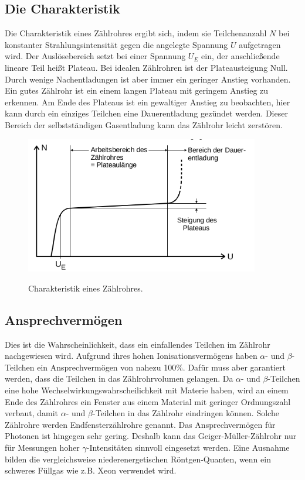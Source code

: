 \subsection{Die Charakteristik}
Die Charakteristik eines Zählrohres ergibt sich, indem sie Teilchenanzahl $N$ bei konstanter
Strahlungsintensität gegen die angelegte Spannung $U$ aufgetragen wird.
Der Auslösebereich setzt bei einer Spannung $U_E$ ein, der anschließende lineare Teil
heißt Plateau. Bei idealen Zählrohren ist der Plateausteigung Null.
Durch wenige Nachentladungen ist aber immer ein geringer Anstieg vorhanden.
Ein gutes Zählrohr ist ein einem langen Plateau mit geringem Anstieg zu erkennen.
Am Ende des Plateaus ist ein gewaltiger Anstieg zu beobachten, hier kann durch ein einziges
Teilchen eine Dauerentladung gezündet werden. Dieser Bereich der selbstständigen Gasentladung
kann das Zählrohr leicht zerstören.

\begin{figure}
  \centering
  \includegraphics[height=6cm]{plateau.png}
  \caption{Charakteristik eines Zählrohres.}
  \cite{skript}
\end{figure}

\subsection{Ansprechvermögen}
Dies ist die Wahrscheinlichkeit, dass ein einfallendes Teilchen im Zählrohr
nachgewiesen wird. Aufgrund ihres hohen Ionisationsvermögens haben
$\alpha$- und $\beta$-Teilchen ein Ansprechvermögen von nahezu 100\%.
Dafür muss aber garantiert werden, dass die Teilchen in das Zählrohrvolumen gelangen.
Da $\alpha$- und $\beta$-Teilchen eine hohe Wechselwirkungswahrscheilichkeit mit Materie
haben, wird an einem Ende des Zählrohres ein Fenster aus einem Material mit
geringer Ordnungszahl verbaut, damit $\alpha$- und $\beta$-Teilchen in das Zählrohr eindringen
können. Solche Zählrohre werden Endfensterzählrohre genannt.
Das Ansprechvermögen für Photonen ist hingegen sehr gering. Deshalb kann das
Geiger-Müller-Zählrohr nur für Messungen hoher $\gamma$-Intensitäten sinnvoll
eingesetzt werden. Eine Ausnahme bilden die vergleichsweise niederenergetischen
Röntgen-Quanten, wenn ein schweres Füllgas wie z.B. Xeon verwendet wird.
